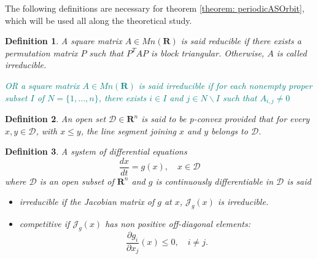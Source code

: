 \documentclass{article}
\newcommand{\marc}[1]{\textcolor{teal}{#1}}
\newtheorem{definition}{Definition}
\begin{document}
The following definitions are necessary for theorem \ref{theorem: periodicASOrbit}, which will be used all along the theoretical study.

\begin{definition}\cite{kaszkurewicz_matrix_2012}
A square matrix $A \in Mn (\mathbf{R})$ is said reducible if there exists a permutation matrix $P$ such that $P^ T AP$ is block triangular. Otherwise, $A$ is called irreducible.

\marc{OR a square matrix $A \in Mn (\mathbf{R})$ is said irreducible if for each nonempty proper subset $I$ of $N = \{1, ..., n\}$, there exists $i \in I$ and $j \in N\backslash I$ such that $A_{i,j} \neq 0$}
\end{definition}

\begin{definition}
An open set $\mathcal{D} \in \mathbf{R}^n$ is said to be p-convex provided that for every $x, y \in \mathcal{D}$, with $x \leq y$, the line segment joining $x$ and $y$ belongs to $\mathcal{D}$.
\end{definition}

\begin{definition}\cite{smith_monotone_1995}
A system of differential equations
$$ \dfrac{d x}{dt} = g(x), \quad x \in \mathcal{D}$$
where $\mathcal{D}$ is an open subset of $\mathbf{R}^n$ and $g$ is continuously differentiable in $\mathcal{D}$ is said 

\begin{itemize}
\item irreducible if the Jacobian matrix of $g$ at $x$, $\mathcal{J}_g(x)$ is irreducible.
\item competitive if $\mathcal{J}_g(x)$ has non positive off-diagonal elements:
$$ \dfrac{\partial g_i}{\partial x_j}(x) \leq 0, \quad i \neq j.
$$
\end{itemize}

\end{definition}
\end{document}
